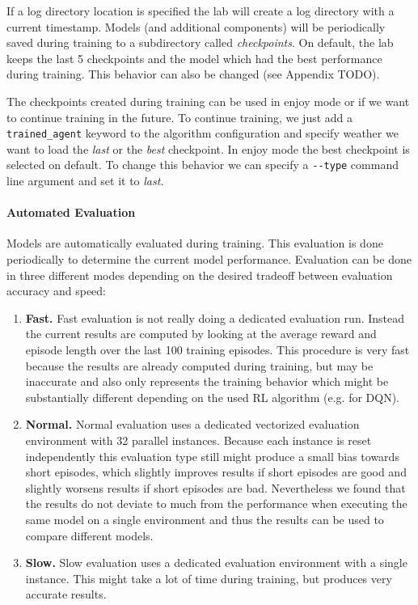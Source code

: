 If a log directory location is specified the lab will create a log directory with a current timestamp. Models (and additional components) will be periodically saved during training to a subdirectory called \textit{checkpoints}. On default, the lab keeps the last 5 checkpoints and the model which had the best performance during training. This behavior can also be changed (see Appendix TODO).

The checkpoints created during training can be used in enjoy mode or if we want to continue training in the future. To continue training, we just add a \texttt{trained\_agent} keyword to the algorithm configuration and specify weather we want to load the \textit{last} or the \textit{best} checkpoint. In enjoy mode the best checkpoint is selected on default. To change this behavior we can specify a \texttt{-{}-type} command line argument and set it to \textit{last}.

\paragraph{Automated Evaluation}
Models are automatically evaluated during training. This evaluation is done periodically to determine the current model performance. Evaluation can be done in three different modes depending on the desired tradeoff between evaluation accuracy and speed:

\begin{enumerate}
    \item \textbf{Fast.} Fast evaluation is not really doing a dedicated evaluation run. Instead the current results are computed by looking at the average reward and episode length over the last 100 training episodes. This procedure is very fast because the results are already computed during training, but may be inaccurate and also only represents the training behavior which might be substantially different depending on the used RL algorithm (e.g. for DQN).
    \item \textbf{Normal.} Normal evaluation uses a dedicated vectorized evaluation environment with 32 parallel instances. Because each instance is reset independently this evaluation type still might produce a small bias towards short episodes, which slightly improves results if short episodes are good and slightly worsens results if short episodes are bad. Nevertheless we found that the results do not deviate to much from the performance when executing the same model on a single environment and thus the results can be used to compare different models.
    \item \textbf{Slow.} Slow evaluation uses a dedicated evaluation environment with a single instance. This might take a lot of time during training, but produces very accurate results. 
\end{enumerate}


